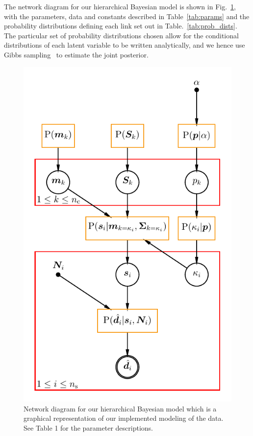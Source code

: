 \documentclass[a4paper,fleqn,usenatbib]{mnras}
\begin{document}
The network diagram for our hierarchical Bayesian model is shown in Fig.~\ref{fig:network_diagram}, with the parameters, data and constants described in Table~\ref{tab:params} and the probability distributions defining each link set out in Table.~\ref{tab:prob_dists}. The particular set of probability distributions chosen allow for the conditional distributions of each latent variable to be written analytically, and we hence use Gibbs sampling~\cite{Geman_and_Geman:1984Geman_and_Geman:1984} to estimate the joint posterior.

\begin{figure}
	\includegraphics[width=\columnwidth]{bhm_plot.pdf}
    \caption{Network diagram for our hierarchical Bayesian model which is a graphical representation of our implemented modeling of the data. See Table 1 for the parameter descriptions.}
    \label{fig:network_diagram}
\end{figure}
\end{document}
